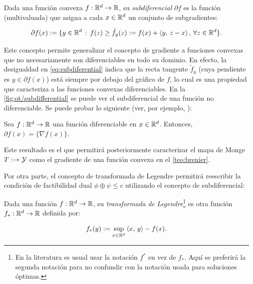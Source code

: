 \begin{defn}[subdiferencial]
	Dada una función convexa $f:\mathbb{R}^d\to\mathbb{R}$, su \textit{subdiferencial} $\partial f$ es la función (multivaluada) que asigna a cada $x\in\mathbb{R}^d$ un conjunto de subgradientes:

	\begin{equation}
		\label{eq:subdiferential}
		\partial f(x) := \{y\in\mathbb{R}^d\,:\,f(z)\geq \tilde{f}_y(z) := f(x) + \left\langle y,\,z-x\right\rangle,\,\forall z\in\mathbb{R}^d\}.
	\end{equation}

\end{defn}

Este concepto permite generalizar el concepto de gradiente a funciones convexas que no necesariamente son diferenciables en todo su dominio. En efecto, la desigualdad en \eqref{eq:subdiferential} indica que la recta tangente $\tilde{f}_y$ (cuya pendiente es $y\in\partial f(x)$) está siempre por debajo del gráfico de $f$, lo cual es una propiedad que caracteriza a las funciones convexas diferenciables. En la \autoref{fig:ot/subdifferential} se puede ver el subdiferencial de una función no diferenciable. Se puede probar lo siguiente (ver, por ejemplo, \cite{villani2003topics}):


\begin{prop}
	Sea $f:\mathbb{R}^d\to\mathbb{R}$ una función diferenciable en $x\in\mathbb{R}^d$. Entonces, $\partial f(x)=\{\nabla f(x)\}$.
\end{prop}

Este resultado es el que permitirá posteriormente caracterizar el mapa de Monge $T:\to\mathcal{Y}$ como el gradiente de una función convexa en el \autoref{teo:brenier}.


Por otra parte, el concepto de transformada de Legendre permitirá reescribir la condición de factibilidad dual $\phi\oplus\psi\leq c$ utilizando el concepto de subdiferencial:

\begin{defn}
	\label{defn:legendre}
	Dada una función $f:\mathbb{R}^d\to\mathbb{R}$, su \textit{transformada de Legendre}\footnote{En la literatura es usual usar la notación $f^*$ en vez de $f_*$. Aquí se preferirá la segunda notación para no confundir con la notación usada para soluciones óptimas.} es otra función $f_*:\mathbb{R}^d\to\mathbb{R}$ definida por:

	\begin{equation*}
		f_*(y) := \sup_{x\in\mathbb{R}^d} \left\langle x,\,y\right\rangle - f(x) .
	\end{equation*}
\end{defn}

